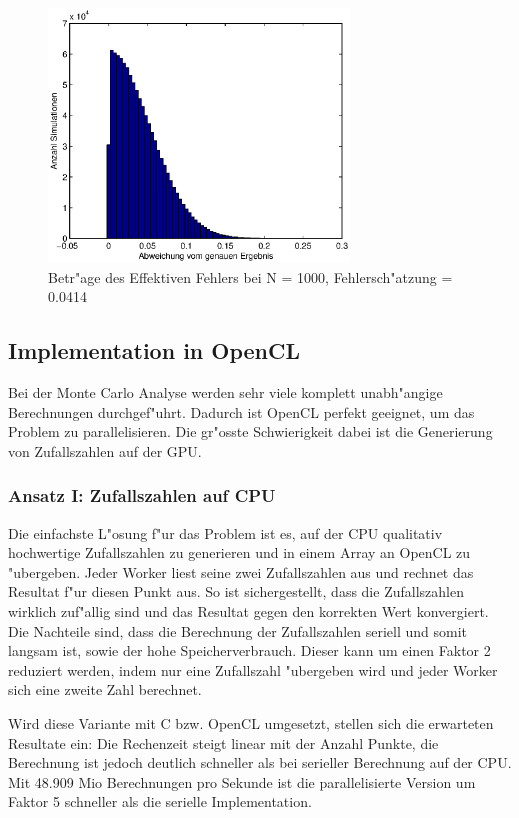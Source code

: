 \begin{refsection}
\begin{figure}[ht!]
    \centering
    \includegraphics[width=8cm]{montecarlo/images/Histogramm.eps}
    \caption{Betr"age des Effektiven Fehlers bei N = 1000, Fehlersch"atzung = 0.0414}
    \label{fig:Histogramm}
\end{figure}


\subsection{Implementation in OpenCL}
Bei der Monte Carlo Analyse werden sehr viele komplett unabh"angige
Berechnungen durchgef"uhrt. Dadurch ist OpenCL perfekt geeignet, um das
Problem zu parallelisieren. Die gr"osste Schwierigkeit dabei ist die
Generierung von Zufallszahlen auf der GPU.

\subsubsection{Ansatz I: Zufallszahlen auf CPU}
Die einfachste L"osung f"ur das Problem ist es, auf der CPU qualitativ
hochwertige Zufallszahlen zu generieren und in einem Array an OpenCL
zu "ubergeben. Jeder Worker liest seine zwei Zufallszahlen aus und
rechnet das Resultat f"ur diesen Punkt aus. So ist sichergestellt,
dass die Zufallszahlen wirklich zuf"allig sind und das Resultat
gegen den korrekten Wert konvergiert. Die Nachteile sind, dass die
Berechnung der Zufallszahlen seriell und somit langsam ist, sowie der
hohe Speicherverbrauch. Dieser kann um einen Faktor 2 reduziert werden,
indem nur eine Zufallszahl "ubergeben wird und jeder Worker sich eine
zweite Zahl berechnet.

Wird diese Variante mit C bzw. OpenCL umgesetzt, stellen sich die
erwarteten Resultate ein: Die Rechenzeit steigt linear mit der Anzahl
Punkte, die Berechnung ist jedoch deutlich schneller als bei serieller
Berechnung auf der CPU. Mit 48.909 Mio Berechnungen pro Sekunde ist
die parallelisierte Version um Faktor 5 schneller  als die serielle
Implementation.


\end{refsection}
